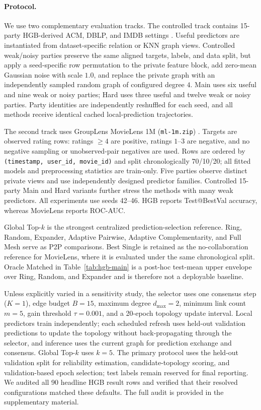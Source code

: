 \documentclass[letterpaper]{article} %
\begin{document}
\paragraph{Protocol.}
We use two complementary evaluation tracks. The controlled track contains
15-party HGB-derived ACM, DBLP, and IMDB settings \cite{lv2021hgb}.
Useful predictors are instantiated from dataset-specific relation or KNN graph
views. Controlled weak/noisy parties preserve the same aligned targets, labels,
and data split, but apply a seed-specific row permutation to the private feature
block, add zero-mean Gaussian noise with scale $1.0$, and replace the private
graph with an independently sampled random graph of configured degree $4$.
Main uses six useful and nine weak or noisy parties; Hard uses three useful and
twelve weak or noisy parties. Party identities are independently reshuffled for
each seed, and all methods receive identical cached local-prediction
trajectories.

The second track uses GroupLens MovieLens 1M (\texttt{ml-1m.zip})
\cite{harper2015movielens}. Targets are observed rating rows: ratings
$\ge4$ are positive, ratings $1$--$3$ are negative, and no negative sampling
or unobserved-pair negatives are used. Rows are ordered by
\texttt{(timestamp, user\_id, movie\_id)} and split chronologically
70/10/20; all fitted models and preprocessing statistics are train-only.
Five parties observe distinct private views and use independently designed
predictor families. Controlled 15-party Main and Hard variants further stress
the methods with many weak predictors. All experiments use seeds 42--46. HGB
reports Test@BestVal accuracy, whereas MovieLens reports ROC-AUC.

Global Top-$k$ is the strongest centralized prediction-selection reference.
Ring, Random, Expander, Adaptive Pairwise, Adaptive Complementarity, and Full
Mesh serve as P2P comparisons. Best Single is retained as the no-collaboration
reference for MovieLens, where it is evaluated under the same chronological
split. Oracle Matched in Table~\ref{tab:hgb-main} is a post-hoc test-mean upper
envelope over Ring, Random, and Expander and is therefore not a deployable
baseline.

Unless explicitly varied in a sensitivity study, the selector uses one
consensus step ($K=1$), edge budget $B=15$, maximum degree
$d_{\max}=2$, minimum link count $m=5$, gain threshold
$\tau=0.001$, and a 20-epoch topology update interval. Local predictors train
independently; each scheduled refresh uses held-out validation predictions to
update the topology without back-propagating through the selector, and inference
uses the current graph for prediction exchange and consensus. Global Top-$k$
uses $k=5$. The primary protocol uses the held-out validation split for
reliability estimation, candidate-topology scoring, and validation-based epoch
selection; test labels remain reserved for final reporting. We audited all 90
headline HGB result rows and verified that their resolved configurations matched
these defaults. The full audit is provided in the supplementary material.
\end{document}
